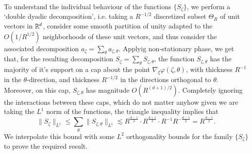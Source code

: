 To understand the individual behaviour of the functions $\{ S_\zeta \}$, we perform a `double dyadic decomposition', i.e. taking a $R^{-1/2}$ discretized subset $\Theta_R$ of unit vectors in $\operatorname{\mathbb{R}}^d$, consider some smooth partition of unity adapted to the $O(1/R^{1/2})$ neighborhoods of these unit vectors, and thus consider the associated decomposition $a_\zeta = \sum_\theta a_{\zeta,\theta}$. Applyig non-stationary phase, we get that, for the resulting decomposition $S_\zeta = \sum_\theta S_{\zeta,\theta}$, the function $S_{\zeta,\theta}$ has the majority of it's support on a cap about the point $\nabla_\xi \varphi(\zeta,\theta)$, with thickness $R^{-1}$ in the $\theta$-direction, and thickness $R^{-1/2}$ in the directions orthogonal to $\theta$. Moreover, on this cap, $S_{\zeta,\theta}$ has magnitude $O(R^{(d+1)/2})$. Completely ignoring the interactions between these caps, which do not matter anyhow given we are taking the $L^1$ norm of the functions, the triangle inequality implies that
%
\[ \| S_\zeta \|_{L^1} \leq \sum_\theta \| S_{\zeta,\theta} \|_{L^1} \lesssim R^{\frac{d-1}{2}} \cdot R^{\frac{d+1}{2}} \cdot R^{-1} R^{- \frac{d-1}{2}} = R^{\frac{d-1}{2}}.  \]
%
We interpolate this bound with some $L^2$ orthogonality bounds for the family $\{ S_\zeta \}$ to prove the required result.

